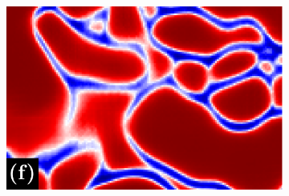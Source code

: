\begin{figure}[t]
\begin{subfigure}[t]{0.16\linewidth}
\includegraphics[width=0.99\linewidth,trim=0in 0in 0in 0.2in,clip]{./figures/LSIMasks/aff_compare_designer/mask_1.pdf} %
\end{subfigure}






\end{figure}

